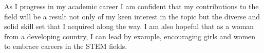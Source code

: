 \documentclass[timesfont,runinheadings]{nsfgrfp}
\begin{document}
As I progress in my academic career I am confident that my contributions to the field will be a result not only of my keen interest in the topic but the diverse and solid skill set that I acquired along the way. I am also hopeful that as a woman from a developing country, I can lead by example, encouraging girls and women to embrace careers in the STEM fields.   
\end{document}
